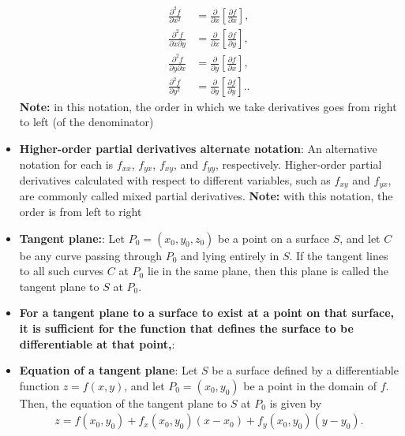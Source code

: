 \documentclass{report}
\begin{document}
\begin{itemize}
\begin{align*}
                    \frac{\partial^2 f}{\partial x^2} &= \frac{\partial}{\partial x}\left[\frac{\partial f}{\partial x}\right], \\
                    \frac{\partial^2 f}{\partial x \partial y} &= \frac{\partial}{\partial x}\left[\frac{\partial f}{\partial y}\right], \\
                    \frac{\partial^2 f}{\partial y \partial x} &= \frac{\partial}{\partial y}\left[\frac{\partial f}{\partial x}\right], \\
                    \frac{\partial^2 f}{\partial y^2} &= \frac{\partial}{\partial y}\left[\frac{\partial f}{\partial y}\right].
                .\end{align*}
                \bigbreak \noindent 
                \textbf{Note:} in this notation, the order in which we take derivatives goes from right to left (of the denominator)
            \item \textbf{Higher-order partial derivatives alternate notation}:
                An alternative notation for each is $f_{xx}$, $f_{yx}$, $f_{xy}$, and $f_{yy}$, respectively. Higher-order partial derivatives calculated with respect to different variables, such as $f_{xy}$ and $f_{yx}$, are commonly called mixed partial derivatives.
                \bigbreak \noindent 
                \textbf{Note:} with this notation, the order is from left to right
            \item \textbf{Tangent plane:}: Let $P_0=(x_0,y_0,z_0)$ be a point on a surface $S$, and let $C$ be any curve passing through $P_0$ and lying entirely in $S$. If the tangent lines to all such curves $C$ at $P_0$ lie in the same plane, then this plane is called the tangent plane to $S$ at $P_0$.
                \bigbreak \noindent 
            \item \textbf{For a tangent plane to a surface to exist at a point on that surface, it is sufficient for the function that defines the surface to be differentiable at that point,}:
            \item \textbf{Equation of a tangent plane}: Let \(S\) be a surface defined by a differentiable function \(z = f(x, y)\), and let \(P_0 = (x_0, y_0)\) be a point in the domain of \(f\). Then, the equation of the tangent plane to \(S\) at \(P_0\) is given by
                \begin{align*}
                    z = f(x_0, y_0) + f_x(x_0, y_0)(x - x_0) + f_y(x_0, y_0)(y - y_0)
                .\end{align*}

\end{itemize}
\end{document}
